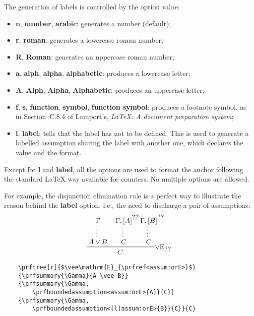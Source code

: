 \documentclass{amsart}
\begin{document}
The generation of labels is controlled by the option value:
\begin{itemize}
\item \textbf{n}, \textbf{number}, \textbf{arabic}: generates a number
  (default);
\item \textbf{r}, \textbf{roman}: generates a lowercase roman number;
\item \textbf{R}, \textbf{Roman}: generates an uppercase
  roman number;
\item \textbf{a}, \textbf{alph}, \textbf{alpha}, \textbf{alphabetic}:
  produces a lowercase letter;
\item \textbf{A}, \textbf{Alph}, \textbf{Alpha}, \textbf{Alphabetic}:
  produces an uppercase letter;
\item \textbf{f}, \textbf{s}, \textbf{function}, \textbf{symbol},
  \textbf{function symbol}: produces a footnote symbol, as in
  Section~C.8.4 of Lamport's, \textit{\LaTeX: A document preparation
    system};
\item \textbf{l}, \textbf{label}: tells that the label has not to be
  defined. This is used to generate a labelled assumption sharing the
  label with another one, which declares the value and the format.
\end{itemize}

Except for \textbf{l} and \textbf{label}, all the options are used to
format the anchor following the standard \LaTeX{} way available for
counters. No multiple options are allowed.

For example, the disjunction elimination rule is a perfect way to
illustrate the reason behind the \textbf{label} option, i.e., the need
to discharge a pair of assumptions: 
\begin{displaymath}
  \begin{prfenv}
    \prfinterspace=1.2em
    \prftree[r]{$\vee\mathrm{E}_{\prfref<assum:orE>}$}
    {\prfsummary{\Gamma}{A \vee B}}
    {\prfsummary{\Gamma, 
        \prfboundedassumption<assum:orE>{A}}{C}}
    {\prfsummary{\Gamma, 
        \prfboundedassumption<[l]assum:orE>{B}}{C}}{C}
  \end{prfenv}
\end{displaymath}
\begin{verbatim}
    \prftree[r]{$\vee\mathrm{E}_{\prfref<assum:orE>}$}
    {\prfsummary{\Gamma}{A \vee B}}
    {\prfsummary{\Gamma, 
        \prfboundedassumption<assum:orE>{A}}{C}}
    {\prfsummary{\Gamma, 
        \prfboundedassumption<[l]assum:orE>{B}}{C}}{C}
\end{verbatim}
\end{document}
